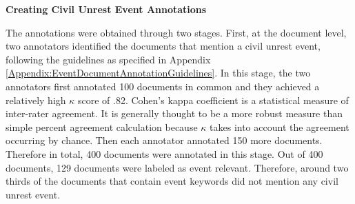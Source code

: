 



\vspace{.1in}
{\bf Creating Civil Unrest Event Annotations}
\vspace{.1in}

The annotations were obtained through two stages. 
First, at the document level, two annotators 
identified the documents that mention a civil unrest event,
following the guidelines as specified in Appendix \ref{Appendix:EventDocumentAnnotationGuidelines}. 
In this stage, the two annotators first annotated 100 documents in common 
and they achieved a relatively high $\kappa$ \cite{Cohen60} score of .82. 
Cohen's kappa coefficient is a statistical measure of inter-rater agreement. 
It is generally thought to be a more robust measure 
than simple percent agreement calculation because 
$\kappa$ takes into account the agreement occurring by chance. 
Then each
annotator annotated 150 more documents.
Therefore in total, 400 documents were annotated in this stage. 
Out of 400 documents, 129 documents were labeled as event relevant. 
Therefore, around two thirds of the documents 
that contain event keywords did not mention any civil unrest event. 

